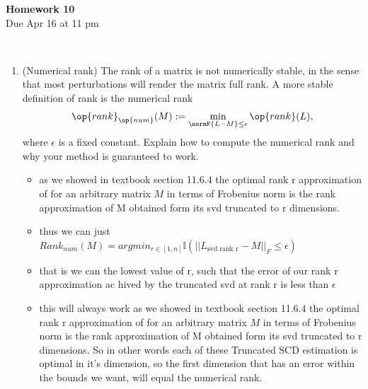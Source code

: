 \documentclass[12pt,twoside]{article}
\begin{document}
\begin{center}
{\large{\textbf{Homework 10}} } \vspace{0.2cm}\\
Due Apr 16 at 11 pm
\\
\end{center}
\\

\begin{enumerate}

\item (Numerical rank) 
The rank of a matrix is not numerically stable, in the sense that most perturbations will render the matrix full rank. A more stable definition of rank is the numerical rank
\begin{align}
\op{rank}_{\op{num}} (M) := \min_{ \normF{L-M} \leq \epsilon }\op{rank} (L),
\end{align}
where $\epsilon$ is a fixed constant. Explain how to compute the numerical rank and why your method is guaranteed to work.
\begin{itemize}
    \color{blue}
    \item as we showed in textbook section 11.6.4 the optimal rank r approximation of for an arbitrary matrix $M$ in terms of Frobenius norm is the rank approximation of M obtained form its svd truncated to r dimensions.  
    \item thus we can just $Rank_{num}(M)=argmin_{r\in [1,n]}\mathbb{I}(||L_{\text{svd rank r}} -M||_{F}\leq \epsilon)$
    \item that is we can the lowest value of r, such that the error of our rank r approximation ac hived by the truncated svd at rank r is less than $\epsilon$
    \item this will always work as we showed in textbook section 11.6.4 the optimal rank r approximation of for an arbitrary matrix $M$ in terms of Frobenius norm is the rank approximation of M obtained form its svd truncated to r dimensions. So in other words each of these Truncated SCD estimation is optimal in it's dimension, so the first dimension that has an error within the bounds we want, will equal the numerical rank.   
\end{itemize}



\end{enumerate}
\end{document}
